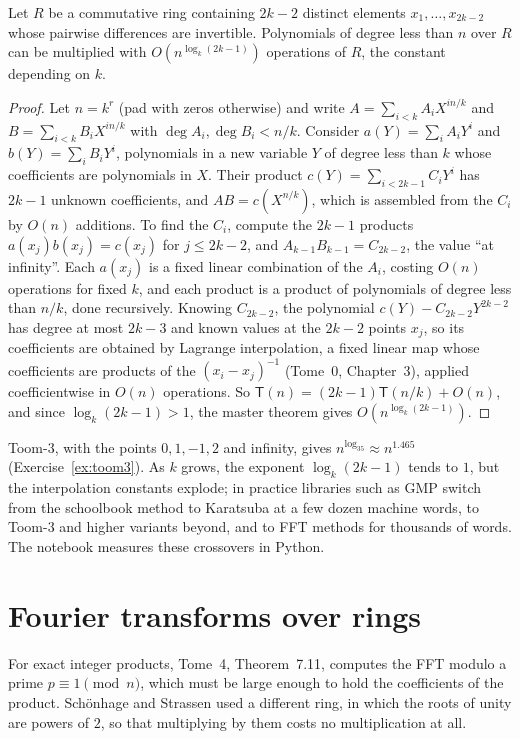 \begin{theorem}\label{thm:toomcook}
Let $R$ be a commutative ring containing $2k-2$ distinct elements $x_1,\dots,x_{2k-2}$ whose pairwise differences are invertible. Polynomials of degree less than $n$ over $R$ can be multiplied with $O(n^{\log_k(2k-1)})$ operations of $R$, the constant depending on $k$.
\end{theorem}
\begin{proof}
Let $n=k^r$ (pad with zeros otherwise) and write $A=\sum_{i<k}A_iX^{in/k}$ and $B=\sum_{i<k}B_iX^{in/k}$ with $\deg A_i,\deg B_i<n/k$. Consider $a(Y)=\sum_iA_iY^i$ and $b(Y)=\sum_iB_iY^i$, polynomials in a new variable $Y$ of degree less than $k$ whose coefficients are polynomials in $X$. Their product
$c(Y)=\sum_{i<2k-1}C_iY^i$ has $2k-1$ unknown coefficients, and $AB=c(X^{n/k})$, which is assembled from the $C_i$ by $O(n)$ additions. To find the $C_i$, compute the $2k-1$ products $a(x_j)b(x_j)=c(x_j)$ for $j\le2k-2$, and $A_{k-1}B_{k-1}=C_{2k-2}$, the value ``at infinity''. Each $a(x_j)$ is a fixed linear combination of the
$A_i$, costing $O(n)$ operations for fixed $k$, and each product is a product of polynomials of degree less than $n/k$, done recursively. Knowing $C_{2k-2}$, the polynomial $c(Y)-C_{2k-2}Y^{2k-2}$ has degree at most $2k-3$ and known values at the $2k-2$ points $x_j$, so its coefficients are obtained by Lagrange interpolation, a fixed linear map whose coefficients are
products of the $(x_i-x_j)^{-1}$ (Tome~0, Chapter~3), applied coefficientwise in $O(n)$ operations. So $\mathsf T(n)=(2k-1)\mathsf T(n/k)+O(n)$, and since $\log_k(2k-1)>1$, the master theorem gives $O(n^{\log_k(2k-1)})$.
\end{proof}

Toom-$3$, with the points $0,1,-1,2$ and infinity, gives $n^{\log_35}\approx n^{1.465}$ (Exercise~\ref{ex:toom3}). As $k$ grows, the exponent $\log_k(2k-1)$ tends to $1$, but the interpolation constants explode; in practice libraries such as GMP switch from the schoolbook method to Karatsuba at a few dozen machine words, to Toom-$3$ and higher
variants beyond, and to FFT methods for thousands of words. The notebook measures these crossovers in Python.

\section{Fourier transforms over rings}\label{sec:ringfft}

For exact integer products, Tome~4, Theorem~7.11, computes the FFT modulo a prime $p\equiv1\pmod n$, which must be large enough to hold the coefficients of the product. Sch\"onhage and Strassen used a different ring, in which the roots of unity are powers of $2$, so that multiplying by them costs no multiplication at all.

